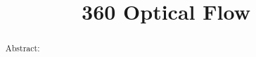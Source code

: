 \documentclass[a4paper,11pt,twoside]{report}
\title{360 Optical Flow}
\begin{document}
\maketitle

\tableofcontents

\begin{abstract}
Abstract: 
\end{abstract}













\end{document}
